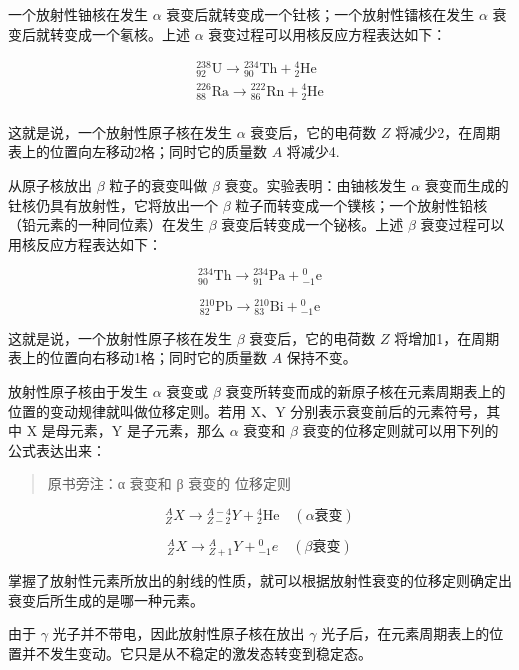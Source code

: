 一个放射性铀核在发生 \(\alpha\)
衰变后就转变成一个钍核；一个放射性镭核在发生 \(\alpha\)
衰变后就转变成一个氡核。上述 \(\alpha\)
衰变过程可以用核反应方程表达如下：

\[
\begin{array}{l} { } _ {92}^{238}\mathrm{U}\longrightarrow { } _ {90}^{234}\mathrm{Th}+{ } _ {2}^{4}\mathrm{He} \\ { } _ {88}^{226}\mathrm{Ra}\longrightarrow { } _ {86}^{222}\mathrm{Rn}+{ } _ {2}^{4}\mathrm{He} \\ \end{array}
\]

这就是说，一个放射性原子核在发生 \(\alpha\) 衰变后，它的电荷数 \(Z\)
将减少2，在周期表上的位置向左移动2格；同时它的质量数 \(A\) 将减少4.

从原子核放出 \(\beta\) 粒子的衰变叫做 \(\beta\)
衰变。实验表明：由铀核发生 \(\alpha\)
衰变而生成的钍核仍具有放射性，它将放出一个 \(\beta\)
粒子而转变成一个镤核；一个放射性铅核（铅元素的一种同位素）在发生
\(\beta\) 衰变后转变成一个铋核。上述 \(\beta\)
衰变过程可以用核反应方程表达如下：

\[
{ } _ {90}^{234}\mathrm{Th}\longrightarrow { } _ {91}^{234}\mathrm{Pa}+{ } _ {-1}^{0}\mathrm{e}
\]

\[
{ } _ {82}^{210}\mathrm{Pb}\longrightarrow { } _ {83}^{210}\mathrm{Bi}+{ } _ {-1}^{0}\mathrm{e}
\]

这就是说，一个放射性原子核在发生 \(\beta\) 衰变后，它的电荷数 \(Z\)
将增加1，在周期表上的位置向右移动1格；同时它的质量数 \(A\) 保持不变。

放射性原子核由于发生 \(\alpha\) 衰变或 \(\beta\)
衰变所转变而成的新原子核在元素周期表上的位置的变动规律就叫做位移定则。若用
X、Y 分别表示衰变前后的元素符号，其中 X 是母元素，Y 是子元素，那么
\(\alpha\) 衰变和 \(\beta\) 衰变的位移定则就可以用下列的公式表达出来：

\begin{quote}
原书旁注：α 衰变和 β 衰变的 位移定则
\end{quote}

\[
{ } _ { Z } ^ { A } X \longrightarrow { } _ { Z - 2 } ^ { A - 4 } Y + { } _ { 2 } ^ { 4 } \mathrm{He} \quad ( \alpha \text{衰变} )
\]

\[
{ } _ { Z } ^ { A } X \longrightarrow { } _ { Z + 1 } ^ { A } Y + { } _ { -1 } ^ { 0 } e \quad ( \beta \text{衰变} )
\]

掌握了放射性元素所放出的射线的性质，就可以根据放射性衰变的位移定则确定出衰变后所生成的是哪一种元素。

由于 \(\gamma\) 光子并不带电，因此放射性原子核在放出 \(\gamma\)
光子后，在元素周期表上的位置并不发生变动。它只是从不稳定的激发态转变到稳定态。

